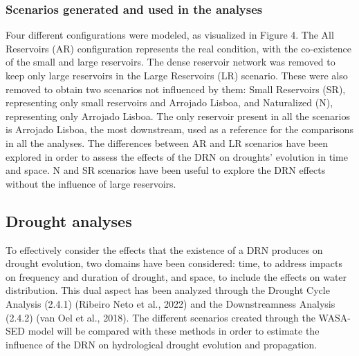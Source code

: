 \documentclass[draft]{agujournal2019}
\begin{document}
\subsubsection{Scenarios generated and used in the analyses}
Four different configurations were modeled, as visualized in Figure 4. The All Reservoirs (AR) configuration represents the real condition, with the co-existence of the small and large reservoirs. The dense reservoir network was removed to keep only large reservoirs in the Large Reservoirs (LR) scenario. These were also removed to obtain two scenarios not influenced by them: Small Reservoirs (SR), representing only small reservoirs and Arrojado Lisboa, and Naturalized (N), representing only Arrojado Lisboa. The only reservoir present in all the scenarios is Arrojado Lisboa, the most downstream, used as a reference for the comparisons in all the analyses. The differences between AR and LR scenarios have been explored in order to assess the effects of the DRN on droughts’ evolution in time and space. N and SR scenarios have been useful to explore the DRN effects without the influence of large reservoirs.

\subsection{Drought analyses}
To effectively consider the effects that the existence of a DRN produces on drought evolution, two domains have been considered: time, to address impacts on frequency and duration of drought, and space, to include the effects on water distribution. This dual aspect has been analyzed through the Drought Cycle Analysis (2.4.1) (Ribeiro Neto et al., 2022) and the Downstreamness Analysis (2.4.2) (van Oel et al., 2018). The different scenarios created through the WASA-SED model will be compared with these methods in order to estimate the influence of the DRN on hydrological drought evolution and propagation.
\end{document}

